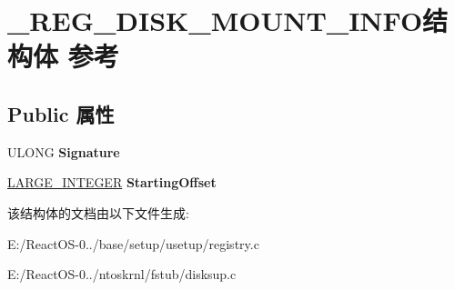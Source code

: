 \hypertarget{struct___r_e_g___d_i_s_k___m_o_u_n_t___i_n_f_o}{}\section{\+\_\+\+R\+E\+G\+\_\+\+D\+I\+S\+K\+\_\+\+M\+O\+U\+N\+T\+\_\+\+I\+N\+F\+O结构体 参考}
\label{struct___r_e_g___d_i_s_k___m_o_u_n_t___i_n_f_o}
\subsection*{Public 属性}
\begin{DoxyCompactItemize}
\item 
\mbox{\label{struct___r_e_g___d_i_s_k___m_o_u_n_t___i_n_f_o_ad0f9a11067f7b5c614236eac616f34d8}} 
U\+L\+O\+NG {\bfseries Signature}
\item 
\mbox{\label{struct___r_e_g___d_i_s_k___m_o_u_n_t___i_n_f_o_adecc7df0ee74b9909426bc6759770ee6}} 
\hyperlink{union___l_a_r_g_e___i_n_t_e_g_e_r}{L\+A\+R\+G\+E\+\_\+\+I\+N\+T\+E\+G\+ER} {\bfseries Starting\+Offset}
\end{DoxyCompactItemize}


该结构体的文档由以下文件生成\+:\begin{DoxyCompactItemize}
\item 
E\+:/\+React\+O\+S-\/0../base/setup/usetup/registry.\+c\item 
E\+:/\+React\+O\+S-\/0../ntoskrnl/fstub/disksup.\+c\end{DoxyCompactItemize}
